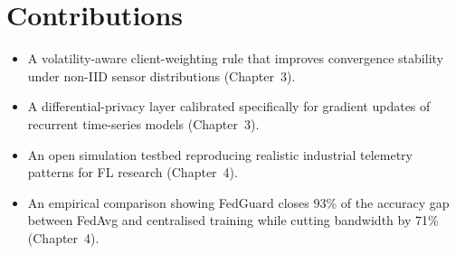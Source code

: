 \section{Contributions}
\begin{tcolorbox}[insightbox,title=Summary of Contributions]
\begin{itemize}[leftmargin=1.3em]
  \item A volatility-aware client-weighting rule that improves convergence stability
        under non-IID sensor distributions (Chapter~3).
  \item A differential-privacy layer calibrated specifically for gradient updates of
        recurrent time-series models (Chapter~3).
  \item An open simulation testbed reproducing realistic industrial telemetry patterns
        for FL research (Chapter~4).
  \item An empirical comparison showing FedGuard closes 93\% of the accuracy gap between
        FedAvg and centralised training while cutting bandwidth by 71\% (Chapter~4).
\end{itemize}
\end{tcolorbox}
